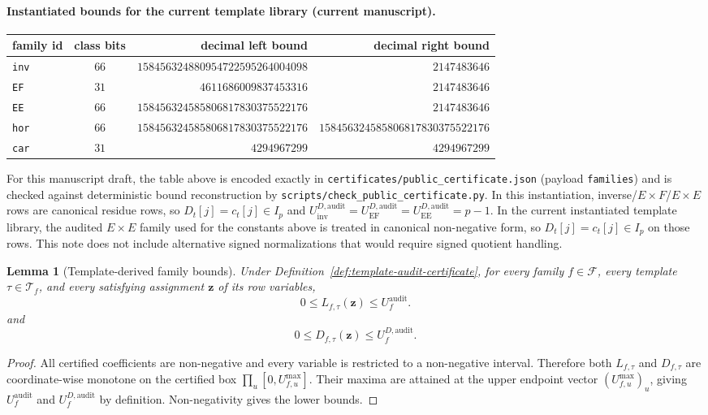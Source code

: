 ﻿\documentclass[11pt]{article}
\newtheorem{lemma}[theorem]{Lemma}
\begin{document}
\paragraph{Instantiated bounds for the current template library (current manuscript).}
\begin{center}
\begin{tabular}{|l|c|r|r|}
\hline
family id & class bits & decimal left bound & decimal right bound \\
\hline
\texttt{inv} & \(66\) & \(158456324880954722595264004098\) & \(2147483646\) \\
\hline
\texttt{EF} & \(31\) & \(4611686009837453316\) & \(2147483646\) \\
\hline
\texttt{EE} & \(66\) & \(158456324585806817830375522176\) & \(2147483646\) \\
\hline
\texttt{hor} & \(66\) & \(158456324585806817830375522176\) & \(158456324585806817830375522176\) \\
\hline
\texttt{car} & \(31\) & \(4294967299\) & \(4294967299\) \\
\hline
\end{tabular}
\end{center}
For this manuscript draft, the table above is encoded exactly in
\texttt{certificates/public\_certificate.json} (payload \texttt{families}) and
is checked against deterministic bound reconstruction by
\texttt{scripts/check\_public\_certificate.py}.
In this instantiation, inverse/\(E\times F\)/\(E\times E\) rows are canonical
residue rows, so \(D_t[j]=c_t[j]\in I_p\) and
\(U_{\mathrm{inv}}^{D,\mathrm{audit}}=
U_{\mathrm{EF}}^{D,\mathrm{audit}}=
U_{\mathrm{EE}}^{D,\mathrm{audit}}=p-1\).
In the current instantiated template library, the audited \(E\times E\) family
used for the constants above is treated in canonical non-negative form, so
\(D_t[j]=c_t[j]\in I_p\) on those rows. This note does not include alternative
signed normalizations that would require signed quotient handling.

\begin{lemma}[Template-derived family bounds]
\label{lem:template-bound-soundness}
Under Definition~\ref{def:template-audit-certificate}, for every family
\(f\in\mathcal F\), every template \(\tau\in\mathcal T_f\), and every satisfying
assignment \(\mathbf z\) of its row variables,
\[
0 \le L_{f,\tau}(\mathbf z) \le U_f^{\mathrm{audit}}.
\]
and
\[
0 \le D_{f,\tau}(\mathbf z) \le U_f^{D,\mathrm{audit}}.
\]
\end{lemma}

\begin{proof}
All certified coefficients are non-negative and every variable is restricted to
a non-negative interval. Therefore both \(L_{f,\tau}\) and \(D_{f,\tau}\) are
coordinate-wise monotone on the certified box
\(\prod_u [0,U_{f,u}^{\max}]\). Their maxima are attained at the upper endpoint
vector \((U_{f,u}^{\max})_u\), giving
\(U_f^{\mathrm{audit}}\) and \(U_f^{D,\mathrm{audit}}\) by definition.
Non-negativity gives the lower bounds.
\end{proof}
\end{document}
